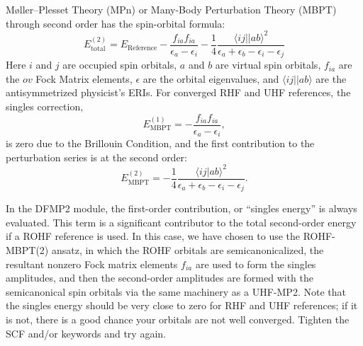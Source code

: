 M\o{}ller--Plesset Theory (MPn) or Many-Body Perturbation Theory (MBPT) through second order has the spin-orbital formula:
\begin{equation}
E_{\mathrm{total}}^{(2)}  = E_{\mathrm{Reference}} - \frac{f_{ia}
f_{ia}}{\epsilon_a - \epsilon_i} - \frac{1}{4} \frac{\langle ij||ab\rangle^2}{\epsilon_a + \epsilon_b - \epsilon_i - \epsilon_j}
\end{equation}
Here $i$ and $j$ are occupied spin orbitals, $a$ and $b$ are virtual spin
orbitals, $f_{ia}$ are the $ov$ Fock Matrix elements, $\epsilon$ are the orbital
eigenvalues, and $\langle ij||ab\rangle$ are the antisymmetrized physicist's ERIs. For
converged RHF and UHF references, the singles correction,
\begin{equation}
E_{\mathrm{MBPT}}^{(1)} = - \frac{f_{ia} f_{ia}}{\epsilon_a - \epsilon_i},
\end{equation}
is zero due to the Brillouin Condition, and the first contribution to the perturbation series is at the second order:
\begin{equation}
E_{\mathrm{MBPT}}^{(2)}  = - \frac{1}{4} \frac{\langle ij|ab\rangle^2}{\epsilon_a + \epsilon_b - \epsilon_i - \epsilon_j}.
\end{equation}

In the DFMP2 module, the first-order contribution, or ``singles energy'' is
always evaluated. This term is a significant contributor to the total
second-order energy if a ROHF reference is used. In this case, we have chosen
to use the ROHF-MBPT(2) ansatz, in which the ROHF orbitals are
semicanonicalized, the resultant nonzero Fock matrix elements $f_{ia}$ are used
to form the singles amplitudes, and then the second-order amplitudes are formed
with the semicanonical spin orbitals via the same machinery as a UHF-MP2. Note
that the singles energy should be very close to zero for RHF and UHF references;
if it is not, there is a good chance your orbitals are not well converged.
Tighten the SCF  and/or  keywords
and try again. 

